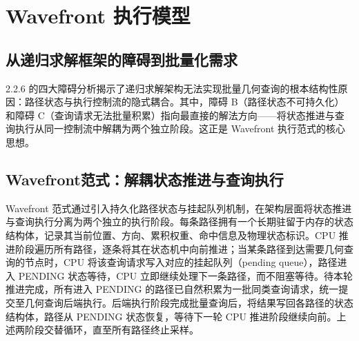 \section{Wavefront 执行模型}

\subsection{从递归求解框架的障碍到批量化需求}

2.2.6 的四大障碍分析揭示了递归求解架构无法实现批量几何查询的根本结构性原因：路径状态与执行控制流的隐式耦合。其中，障碍 B（路径状态不可持久化）和障碍 C（查询请求无法批量积累）指向最直接的解法方向——将状态推进与查询执行从同一控制流中解耦为两个独立阶段。这正是 Wavefront 执行范式的核心思想。

\subsection{Wavefront范式：解耦状态推进与查询执行}

Wavefront 范式通过引入持久化路径状态与挂起队列机制，在架构层面将状态推进与查询执行分离为两个独立的执行阶段。每条路径拥有一个长期驻留于内存的状态结构体，记录其当前位置、方向、累积权重、命中信息及物理状态标识。CPU 推进阶段遍历所有路径，逐条将其在状态机中向前推进；当某条路径到达需要几何查询的节点时，CPU 将该查询请求写入对应的挂起队列（pending queue），路径进入 PENDING 状态等待，CPU 立即继续处理下一条路径，而不阻塞等待。待本轮推进完成，所有进入 PENDING 的路径已自然积累为一批同类查询请求，统一提交至几何查询后端执行。后端执行阶段完成批量查询后，将结果写回各路径的状态结构体，路径从 PENDING 状态恢复，等待下一轮 CPU 推进阶段继续向前。上述两阶段交替循环，直至所有路径终止采样。

